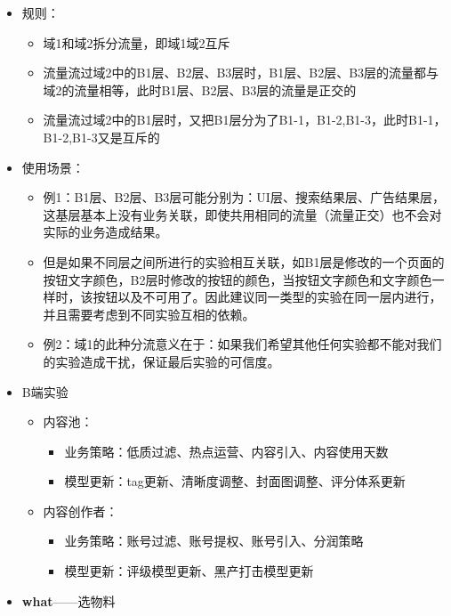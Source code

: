 \documentclass[
  letterpaper,
  DIV=11,
  numbers=noendperiod]{scrreprt}
\begin{document}
\begin{itemize}
\item
  规则：

  \begin{itemize}
  \item
    域1和域2拆分流量，即域1域2互斥
  \item
    流量流过域2中的B1层、B2层、B3层时，B1层、B2层、B3层的流量都与域2的流量相等，此时B1层、B2层、B3层的流量是正交的
  \item
    流量流过域2中的B1层时，又把B1层分为了B1-1，B1-2,B1-3，此时B1-1，B1-2,B1-3又是互斥的
  \end{itemize}
\item
  使用场景：

  \begin{itemize}
  \item
    例1：B1层、B2层、B3层可能分别为：UI层、搜索结果层、广告结果层，这基层基本上没有业务关联，即使共用相同的流量（流量正交）也不会对实际的业务造成结果。
  \item
    但是如果不同层之间所进行的实验相互关联，如B1层是修改的一个页面的按钮文字颜色，B2层时修改的按钮的颜色，当按钮文字颜色和文字颜色一样时，该按钮以及不可用了。因此建议同一类型的实验在同一层内进行，并且需要考虑到不同实验互相的依赖。
  \item
    例2：域1的此种分流意义在于：如果我们希望其他任何实验都不能对我们的实验造成干扰，保证最后实验的可信度。
  \end{itemize}
\item
  B端实验

  \begin{itemize}
  \item
    内容池：

    \begin{itemize}
    \item
      业务策略：低质过滤、热点运营、内容引入、内容使用天数
    \item
      模型更新：tag更新、清晰度调整、封面图调整、评分体系更新
    \end{itemize}
  \item
    内容创作者：

    \begin{itemize}
    \item
      业务策略：账号过滤、账号提权、账号引入、分润策略
    \item
      模型更新：评级模型更新、黑产打击模型更新
    \end{itemize}
  \end{itemize}
\item
  \textbf{what}------选物料
\end{itemize}
\end{document}

